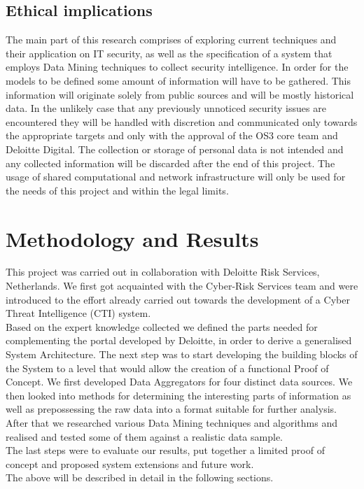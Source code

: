 \documentclass[12pt]{article}
\begin{document}
\subsection{Ethical implications}

The main part of this research comprises of exploring current techniques and their application on IT security, as well as the specification of a system that employs Data Mining techniques to collect security intelligence. In order for the models to be defined some amount of information will have to be gathered. This information will originate solely from public sources and will be mostly historical data. In the unlikely case that any previously unnoticed security issues are encountered they will be handled with discretion and communicated only towards the appropriate targets and only with the approval of the OS3 core team and Deloitte Digital. The collection or storage of personal data is not intended and any collected information will be discarded after the end of this project. The usage of shared computational and network infrastructure will only be used for the needs of this project and within the legal limits.

\newpage
\section{Methodology and Results}
This project was carried out in collaboration with Deloitte Risk Services, Netherlands. We first got acquainted with the Cyber-Risk Services team and were introduced to the effort already carried out towards the development of a Cyber Threat Intelligence (CTI) system. \\
Based on the expert knowledge collected we defined the parts needed for complementing the portal developed by Deloitte, in order to derive a generalised System Architecture. The next step was to start developing the building blocks of the System to a level that would allow the creation of a functional Proof of Concept. We first developed Data Aggregators for four distinct data sources. We then looked into methods for determining the interesting parts of information as well as prepossessing the raw data into a format suitable for further analysis. After that we researched various Data Mining techniques and algorithms and realised and tested some of them against a realistic data sample. \\
The last steps were to evaluate our results, put together a limited proof of concept and proposed system extensions and future work. \\
The above will be described in detail in the following sections. 
\end{document}
